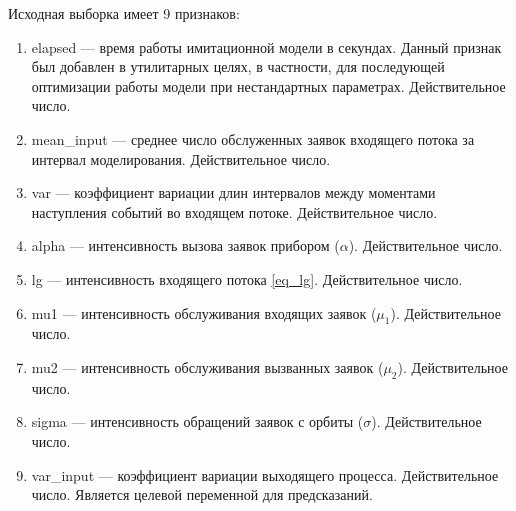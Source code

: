 Исходная выборка имеет 9 признаков:
\begin{enumerate}
	\item elapsed --- время работы имитационной модели в секундах. Данный признак был добавлен в утилитарных целях, в частности, для последующей оптимизации работы модели при нестандартных параметрах. Действительное число.
	\item mean\_input --- среднее число обслуженных заявок входящего потока за интервал моделирования. Действительное число.
	\item var --- коэффициент вариации длин интервалов между моментами наступления событий во входящем потоке. Действительное число.
	\item alpha --- интенсивность вызова заявок прибором ($\alpha$). Действительное число.
	\item lg --- интенсивность входящего потока \eqref{eq_lg}. Действительное число.
	\item mu1 --- интенсивность обслуживания входящих заявок ($\mu_1$). Действительное число.
	\item mu2 --- интенсивность обслуживания вызванных заявок ($\mu_2$). Действительное число.
	\item sigma --- интенсивность обращений заявок с орбиты ($\sigma$). Действительное число.
	\item var\_input --- коэффициент вариации выходящего процесса. Действительное число. Является целевой переменной для предсказаний.
\end{enumerate}

